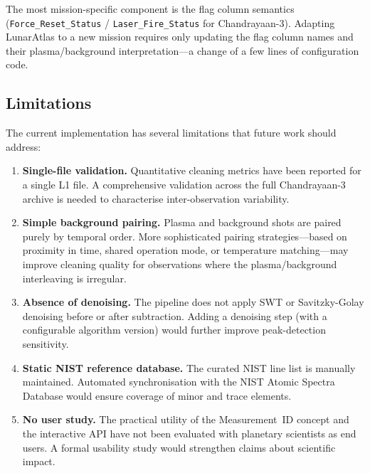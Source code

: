 \documentclass[a4paper,twocolumn,10pt]{article}
\begin{document}
The most mission-specific component is the flag column semantics
(\texttt{Force\_Reset\_Status} / \texttt{Laser\_Fire\_Status} for
Chandrayaan-3).  Adapting LunarAtlas to a new mission requires only
updating the flag column names and their
plasma/background interpretation---a change of a few lines of
configuration code.

\subsection{Limitations}

The current implementation has several limitations that future work
should address:

\begin{enumerate}[nosep,leftmargin=*]
  \item \textbf{Single-file validation.}  Quantitative cleaning
    metrics have been reported for a single L1 file.  A comprehensive
    validation across the full Chandrayaan-3 archive is needed to
    characterise inter-observation variability.

  \item \textbf{Simple background pairing.}  Plasma and background
    shots are paired purely by temporal order.  More sophisticated
    pairing strategies---based on proximity in time, shared operation
    mode, or temperature matching---may improve cleaning quality
    for observations where the plasma/background interleaving
    is irregular.

  \item \textbf{Absence of denoising.}  The pipeline does not apply
    SWT or Savitzky-Golay denoising before or after subtraction.
    Adding a denoising step (with a configurable algorithm version)
    would further improve peak-detection sensitivity.

  \item \textbf{Static NIST reference database.}  The curated NIST
    line list is manually maintained.  Automated synchronisation with
    the NIST Atomic Spectra Database would ensure coverage of minor
    and trace elements.

  \item \textbf{No user study.}  The practical utility of the
    Measurement~ID concept and the interactive API have not been
    evaluated with planetary scientists as end users.  A formal
    usability study would strengthen claims about scientific impact.
\end{enumerate}


\end{document}
